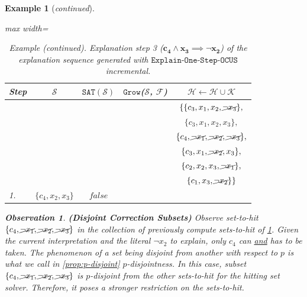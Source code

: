 \documentclass[twoside,11pt]{article}
\newcommand\m[1]{\mathcal{#1}}
\newtheorem{example}{Example}
\newtheorem{observation}[obs]{Observation}
\newcommand\setstohit{\ensuremath{\m{H} }\xspace}
\newcommand\formula{\ensuremath{\m{F} }\xspace}
\newcommand\mm[1]{\ensuremath{#1}\xspace}
\newcommand\call[1]{\mm{\texttt{#1}}}
\newcommand\sat{\texttt{{SAT}}\xspace}
\newcommand\grow{\mm{\call{Grow}}}
\newcommand\onestepo{\ensuremath{\call{Explain-One-Step-OCUS}}\xspace}
\begin{document}
\begin{example}[\textit{continued}]
\begin{table}[!h]
	\centering
	\begin{adjustbox}{max width=\textwidth}
	\begin{tabular}{lcccc} 
		Step & $\m{S}$                             & $\sat(\m{S})$    & \grow($\m{S}$, $\formula$)                                 & $\setstohit  \gets \setstohit  \cup \m{K}$ \\ \toprule[2pt]
			&    &  &     &  $\{ \{c_3, {x_1}, x_2,\cancel{\lnot x_3} \}, $                                \\
			&    &  &     &  $\{c_3, {x_1} , x_2 , {x_3}\}, $                                \\
			&    &  &     &  $\{c_4, \cancel{\lnot x_1} ,\cancel{\lnot x_2} , \cancel{\lnot x_3}\}, $                                \\
			&    &  &     &  $\{c_3, {x_1} , \cancel{\lnot x_2} , {x_3}\}, $                                \\
			&    &  &     &  $\{c_2, x_2, {x_3},  \cancel{\lnot x_1}\}, $                                \\
			&    &  &     &  $\{ c_1, {x_3},  \cancel{\lnot x_2}\}\}$                                \\\midrule
		1. &  $\{ c_4, x_2, x_3  \}$  & $\mathit{false}$ & \phantom{$\{ c_1,  c_3, c_4, x_1, \lnot x_2,\lnot x_3 \}$}    & \phantom{$\{..., \{ c_2, \lnot x_2, \lnot x_3\}\}$ }\\
	\end{tabular}
	\end{adjustbox}
	\caption{\textit{Example (continued)}. Explanation step 3 ($\mathbf{c_4 \wedge x_3 \implies \lnot x_2}$) of the explanation sequence generated with \onestepo \emph{incremental}. }
	\label{tab:example-explanation-generation:incr:step3}
\end{table}

\begin{observation}\textbf{(Disjoint Correction Subsets)} Observe set-to-hit $\{ c_4, \cancel{\lnot x_1}, \cancel{\lnot x_2}, \cancel{\lnot x_3}\}$ in the collection of previously compute sets-to-hit of \cref{tab:example-explanation-generation:incr:step3}. Given the current interpretation and the literal $\lnot x_2$ to explain, only $c_4$ can \underline{and} has to be taken. 
The phenomenon of a set being disjoint from another with respect to $p$ is what we call in \cref{prop:p-disjoint} $p$-disjointness.
In this case, subset $\{ c_4, \cancel{\lnot x_1}, \cancel{\lnot x_2}, \cancel{\lnot x_3}\}$ is $p$-disjoint from the other sets-to-hit for the hitting set solver. Therefore, it poses a stronger restriction on the sets-to-hit. 
\end{observation}
\end{example}
\end{document}
